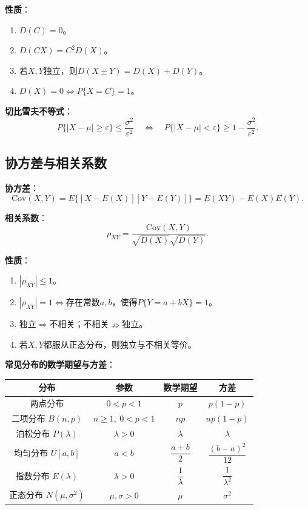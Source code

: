 \documentclass[11pt,a4paper]{report}
\theoremstyle{definition}
\theoremstyle{plain}
\begin{document}
\textbf{性质}：
\begin{enumerate}[label=\arabic*.,leftmargin=2em]
    \item $D(C)=0$。
    \item $D(CX)=C^2D(X)$。
    \item 若$X,Y$独立，则$D(X\pm Y)=D(X)+D(Y)$。
    \item $D(X)=0\iff P\{X=C\}=1$。
\end{enumerate}

\textbf{切比雪夫不等式}：
\[
P\{|X-\mu|\geq\varepsilon\}\leq\frac{\sigma^2}{\varepsilon^2}
\quad\Longleftrightarrow\quad
P\{|X-\mu|<\varepsilon\}\geq 1-\frac{\sigma^2}{\varepsilon^2}.
\]

\subsection{协方差与相关系数}

\textbf{协方差}：
\[
\mathrm{Cov}(X,Y)=E\{[X-E(X)][Y-E(Y)]\}=E(XY)-E(X)E(Y).
\]

\textbf{相关系数}：
\[
\rho_{XY}=\frac{\mathrm{Cov}(X,Y)}{\sqrt{D(X)}\sqrt{D(Y)}}.
\]

\textbf{性质}：
\begin{enumerate}[label=\arabic*.,leftmargin=2em]
    \item $|\rho_{XY}|\leq 1$。
    \item $|\rho_{XY}|=1\iff$存在常数$a,b$，使得$P\{Y=a+bX\}=1$。
    \item 独立$\Rightarrow$不相关；不相关$\nRightarrow$独立。
    \item 若$X,Y$都服从正态分布，则独立与不相关等价。
\end{enumerate}

\textbf{常见分布的数学期望与方差}：

\begin{center}
\begin{tabular}{c|c|c|c}
\hline
分布 & 参数 & 数学期望 & 方差 \\
\hline
两点分布 & $0<p<1$ & $p$ & $p(1-p)$ \\
\hline
二项分布 $B(n,p)$ & $n\geq 1,\ 0<p<1$ & $np$ & $np(1-p)$ \\
\hline
泊松分布 $P(\lambda)$ & $\lambda>0$ & $\lambda$ & $\lambda$ \\
\hline
均匀分布 $U[a,b]$ & $a<b$ & $\dfrac{a+b}{2}$ & $\dfrac{(b-a)^2}{12}$ \\
\hline
指数分布 $E(\lambda)$ & $\lambda>0$ & $\dfrac{1}{\lambda}$ & $\dfrac{1}{\lambda^2}$ \\
\hline
正态分布 $N(\mu,\sigma^2)$ & $\mu,\sigma>0$ & $\mu$ & $\sigma^2$ \\
\hline
\end{tabular}
\end{center}
\end{document}
